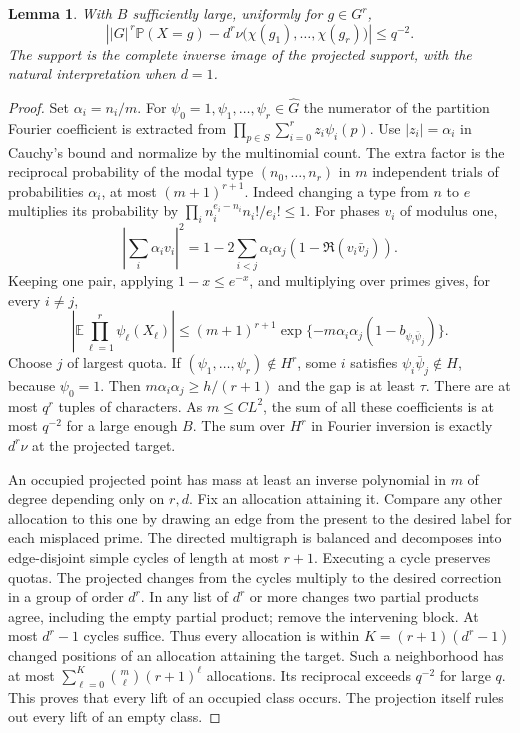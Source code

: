 \documentclass[11pt,letterpaper]{article}
\newtheorem{lemma}[theorem]{Lemma}
\newcommand{\E}{\mathbb E}
\newcommand{\pr}{\mathbb P}
\newcommand{\abs}[1]{\lvert#1\rvert}
\begin{document}
\begin{lemma}\label{lem:lift}
With \(B\) sufficiently large, uniformly for \(g\in G^r\),
\begin{equation}\label{eq:lift}
 \left|\abs G^{\,r}\pr(X=g)-d^r\nu\bigl(\chi(g_1),\ldots,\chi(g_r)\bigr)\right|\le q^{-2}.
\end{equation}
The support is the complete inverse image of the projected support, with the natural interpretation when \(d=1\).
\end{lemma}
\begin{proof}
Set \(\alpha_i=n_i/m\). For \(\psi_0=1,\psi_1,\ldots,\psi_r\in\widehat G\) the numerator of the partition Fourier coefficient is extracted from
\(\prod_{p\in S}\sum_{i=0}^r z_i\psi_i(p)\). Use \(|z_i|=\alpha_i\) in Cauchy's bound and normalize by the multinomial count. The extra factor is the reciprocal probability of the modal type \((n_0,\dots,n_r)\) in \(m\) independent trials of probabilities \(\alpha_i\), at most \((m+1)^{r+1}\). Indeed changing a type from \(n\) to \(e\) multiplies its probability by \(\prod_i n_i^{e_i-n_i}n_i!/e_i!\le1\).
For phases \(v_i\) of modulus one,
\[
 \left|\sum_i\alpha_i v_i\right|^2
 =1-2\sum_{i<j}\alpha_i\alpha_j(1-\Re(v_i\bar v_j)).
\]
Keeping one pair, applying \(1-x\le e^{-x}\), and multiplying over primes gives, for every \(i\ne j\),
\begin{equation}\label{eq:pair}
 \left|\E\prod_{\ell=1}^r\psi_\ell(X_\ell)\right|
 \le (m+1)^{r+1}\exp\{-m\alpha_i\alpha_j(1-b_{\psi_i\bar\psi_j})\}.
\end{equation}
Choose \(j\) of largest quota. If \((\psi_1,\ldots,\psi_r)\notin H^r\), some \(i\) satisfies \(\psi_i\bar\psi_j\notin H\), because \(\psi_0=1\). Then \(m\alpha_i\alpha_j\ge h/(r+1)\) and the gap is at least \(\tau\). There are at most \(q^r\) tuples of characters. As \(m\le C L^2\), the sum of all these coefficients is at most \(q^{-2}\) for a large enough \(B\). The sum over \(H^r\) in Fourier inversion is exactly \(d^r\nu\) at the projected target.

An occupied projected point has mass at least an inverse polynomial in \(m\) of degree depending only on \(r,d\). Fix an allocation attaining it. Compare any other allocation to this one by drawing an edge from the present to the desired label for each misplaced prime. The directed multigraph is balanced and decomposes into edge-disjoint simple cycles of length at most \(r+1\). Executing a cycle preserves quotas. The projected changes from the cycles multiply to the desired correction in a group of order \(d^r\). In any list of \(d^r\) or more changes two partial products agree, including the empty partial product; remove the intervening block. At most \(d^r-1\) cycles suffice. Thus every allocation is within \(K=(r+1)(d^r-1)\) changed positions of an allocation attaining the target. Such a neighborhood has at most \(\sum_{\ell=0}^K\binom m\ell(r+1)^\ell\) allocations. Its reciprocal exceeds \(q^{-2}\) for large \(q\). This proves that every lift of an occupied class occurs. The projection itself rules out every lift of an empty class.
\end{proof}
\end{document}
